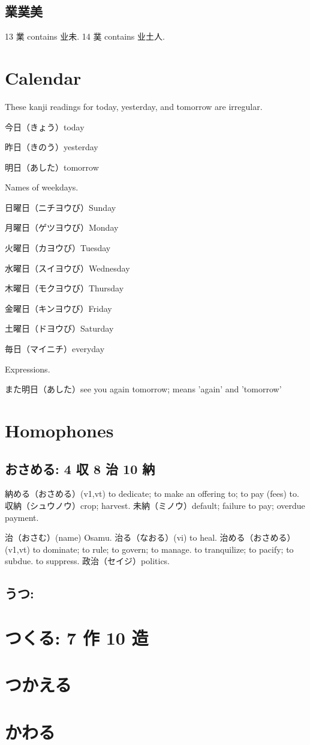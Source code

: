\subsection{業菐美}

13 業 contains 业未.
14 菐 contains 业土人.

\section{Calendar}

These kanji readings for today, yesterday, and tomorrow are irregular.

今日（きょう）today

昨日（きのう）yesterday

明日（あした）tomorrow

Names of weekdays.

日曜日（ニチヨウび）Sunday

月曜日（ゲツヨウび）Monday

火曜日（カヨウび）Tuesday

水曜日（スイヨウび）Wednesday

木曜日（モクヨウび）Thursday

金曜日（キンヨウび）Friday

土曜日（ドヨウび）Saturday

毎日（マイニチ）everyday

Expressions.

また明日（あした）see you again tomorrow; means 'again' and 'tomorrow'

\section{Homophones}

\subsection{おさめる: 4 収 8 治 10 納}

納める（おさめる）(v1,vt)
to dedicate; to make an offering to; to pay (fees) to.
収納（シュウノウ）crop; harvest.
未納（ミノウ）default; failure to pay; overdue payment.

治（おさむ）(name) Osamu.
治る（なおる）(vi) to heal.
治める（おさめる）(v1,vt)
to dominate; to rule; to govern; to manage.
to tranquilize; to pacify; to subdue.
to suppress.
政治（セイジ）politics.

\subsection{うつ:}

\section{つくる: 7 作 10 造}

\section{つかえる}

\section{かわる}
